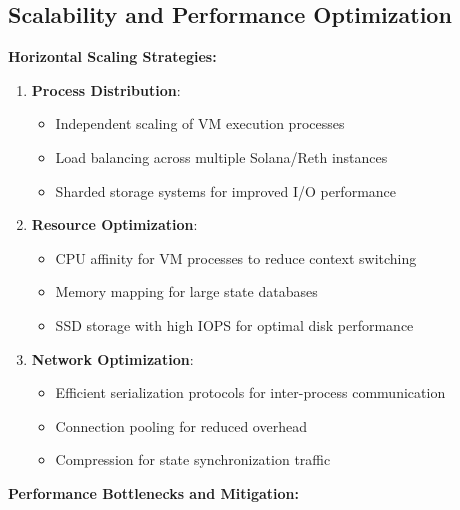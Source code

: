 \documentclass[11pt,a4paper]{article}
\begin{document}
\subsection{Scalability and Performance Optimization}

\textbf{Horizontal Scaling Strategies:}

\begin{enumerate}
    \item \textbf{Process Distribution}:
    \begin{itemize}
        \item Independent scaling of VM execution processes
        \item Load balancing across multiple Solana/Reth instances
        \item Sharded storage systems for improved I/O performance
    \end{itemize}
    
    \item \textbf{Resource Optimization}:
    \begin{itemize}
        \item CPU affinity for VM processes to reduce context switching
        \item Memory mapping for large state databases
        \item SSD storage with high IOPS for optimal disk performance
    \end{itemize}
    
    \item \textbf{Network Optimization}:
    \begin{itemize}
        \item Efficient serialization protocols for inter-process communication
        \item Connection pooling for reduced overhead
        \item Compression for state synchronization traffic
    \end{itemize}
\end{enumerate}

\textbf{Performance Bottlenecks and Mitigation:}
\end{document}
